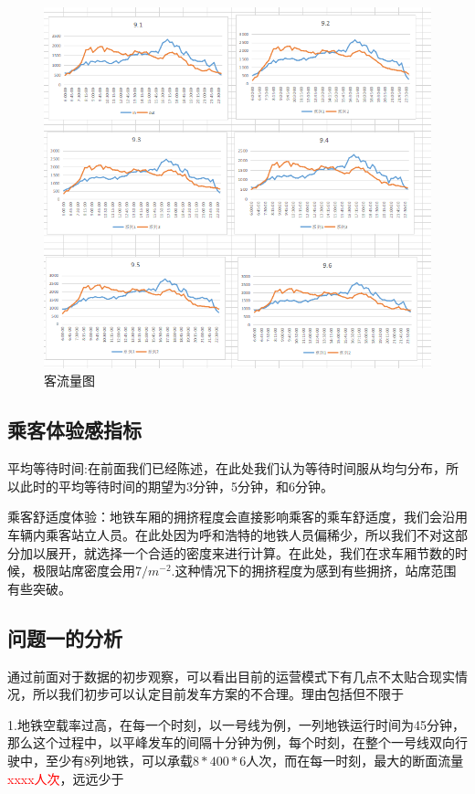 \documentclass[12pt,a4paper]{mcmthesis}
\begin{document}
    \begin{figure}[h!t]
        \centerline{\includegraphics[scale=0.4]{figures/客流图}\quad
        }
        \caption{\song\wuhao
        客流量图}
        \label{fig:客流量}
    \end{figure}

    \subsection{乘客体验感指标}
    平均等待时间:在前面我们已经陈述，在此处我们认为等待时间服从均匀分布，所以此时的平均等待时间的期望为3分钟，5分钟，和6分钟。

    乘客舒适度体验：地铁车厢的拥挤程度会直接影响乘客的乘车舒适度，我们会沿用车辆内乘客站立人员。在此处因为呼和浩特的地铁人员偏稀少，所以我们不对这部分加以展开，就选择一个合适的密度来进行计算。在此处，我们在求车厢节数的时候，极限站席密度会用$7/m^{-2}$.这种情况下的拥挤程度为感到有些拥挤，站席范围有些突破。

    \subsection{问题一的分析}

    通过前面对于数据的初步观察，可以看出目前的运营模式下有几点不太贴合现实情况，所以我们初步可以认定目前发车方案的不合理。理由包括但不限于

    1.地铁空载率过高，在每一个时刻，以一号线为例，一列地铁运行时间为45分钟，那么这个过程中，以平峰发车的间隔十分钟为例，每个时刻，在整个一号线双向行驶中，至少有8列地铁，可以承载$8*400*6$人次，而在每一时刻，最大的断面流量\textcolor{red}{xxxx人次}，远远少于
\end{document}
